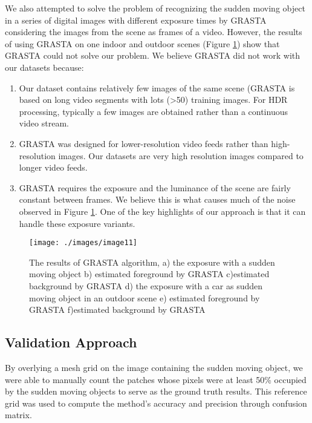 \documentclass[preprint,12pt,3p]{elsarticle}
\begin{document}
We also attempted to solve the problem of recognizing the sudden moving object in a series of digital images with different exposure times by GRASTA considering the images from the scene as frames of a video. However, the results of using GRASTA on one indoor and outdoor scenes (Figure \ref{fig:image11}) show that GRASTA could not solve our problem. We believe GRASTA did not work with our datasets because:
\begin{enumerate}
	\item Our dataset contains relatively few images of the same scene (GRASTA is based on long video segments with lots (\textgreater 50) training images.  For HDR processing, typically a few images are obtained rather than a continuous video stream.
	\item  GRASTA was designed for lower-resolution video feeds rather than high-resolution images.  Our datasets are very high resolution images compared to longer video feeds.
	\item GRASTA requires the exposure and the luminance of the scene are fairly constant between frames. We believe this is what causes much of the noise observed in Figure \ref{fig:image11}. One of the key highlights of our approach is that it can handle these exposure variants.
\end{enumerate}
 
\begin{figure}[h]
\centering
\texttt{[image: ./images/image11]}
\caption{The results of GRASTA algorithm, a) the exposure with a sudden moving object b) estimated foreground by GRASTA c)estimated background by GRASTA d) the exposure with a car as sudden moving object in an outdoor scene e) estimated foreground by GRASTA f)estimated background by GRASTA}
\label{fig:image11}
\end{figure}

\subsection{Validation Approach}
By overlying a mesh grid on the image containing the sudden moving object, we were able to manually count the patches whose pixels were at least 50\% occupied by the sudden moving objects to serve as the ground truth results.  This reference grid was used to compute the method's accuracy and precision through confusion matrix.
\end{document}
